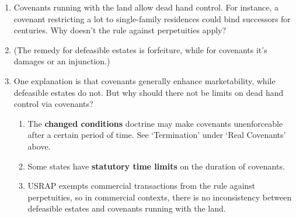 \begin{enumerate}
    \item Covenants running with the land allow dead hand control. For 
    instance, a covenant restricting a lot to single-family residences could 
    bind successors for centuries. Why doesn't the rule against perpetuities 
    apply?
    \item (The remedy for defeasible estates is forfeiture, while for 
    covenants it's damages or an injunction.)
    \item One explanation is that covenants generally enhance marketability, 
    while defeasible estates do not. But why should there not be limits on 
    dead hand control via covenants?
    \begin{enumerate}
        \item The \textbf{changed conditions} doctrine may make covenants 
        unenforceable after a certain period of time. See `Termination' under 
        `Real Covenants' above.
        \item Some states have \textbf{statutory time limits} on the duration 
        of covenants.
        \item USRAP exempts commercial transactions from the rule against 
        perpetuities, so in commercial contexts, there is no inconsistency 
        between defeasible estates and covenants running with the land.
    \end{enumerate}
\end{enumerate}
